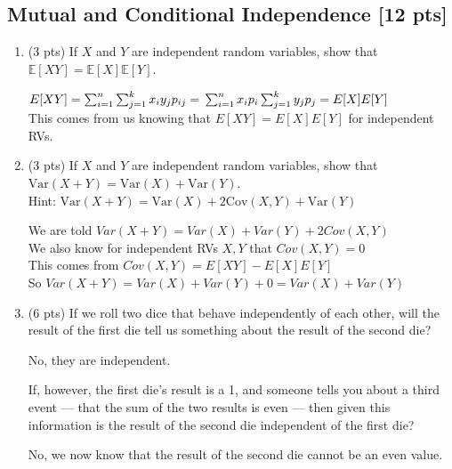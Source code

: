\documentclass[a4paper]{article}
\theoremstyle{definition}
\newcommand{\Var}{\mathrm{Var}}
\newcommand{\Cov}{\mathrm{Cov}}
\newenvironment{soln}{
	\leavevmode\color{blue}\ignorespaces
}{}
\begin{document}
	\subsection{Mutual and Conditional Independence [12 pts]}
	\begin{enumerate}
		\item (3 pts) If $X$ and $Y$ are independent random variables, show that
		$\mathbb{E}[XY] = \mathbb{E}[X]\mathbb{E}[Y]$.
		
		\begin{soln}  $E[XY] = \sum_{i=1}^{n} \sum_{j=1}^{k} x_{i}y_{j}p_{ij} = \\
		\sum_{i=1}^{n}x_{i}p_{i} \sum_{j=1}^{k}y_{j}p_{j} = E[X]E[Y]$ \\
		This comes from us knowing that $E[XY] = E[X]E[Y]$ for independent RVs.
		\end{soln}
		
		\item (3 pts) If $X$ and $Y$ are independent random variables, show that
		$\Var(X+Y) = \Var(X) + \Var(Y)$. \\
		Hint: $\Var(X+Y) = \Var(X) + 2\Cov(X, Y) + \Var(Y)$
		
		\begin{soln}  We are told $Var(X+Y)=Var(X)+Var(Y)+2Cov(X,Y)$ \\
		We also know for independent RVs ${X,Y}$ that $Cov(X,Y)=0$ \\
		This comes from $Cov(X,Y)=E[XY]-E[X]E[Y]$ \\
		So $Var(X+Y)=Var(X)+Var(Y)+0=Var(X)+Var(Y)$
		\end{soln}
		
		\item (6 pts) If we roll two dice that behave independently of each
		other, will the result of the first die tell us something about the
		result of the second die? 
		
		\begin{soln}  No, they are independent. \end{soln}
		
		If, however, the first die's result is a 1,
		and someone tells you about a third event --- that the sum of the two
		results is even --- then given this information is the result of the second die
		independent of the first die? 
		
		\begin{soln}  No, we now know that the result of the second die cannot be an even value. \end{soln}
	\end{enumerate}
	
\end{document}
